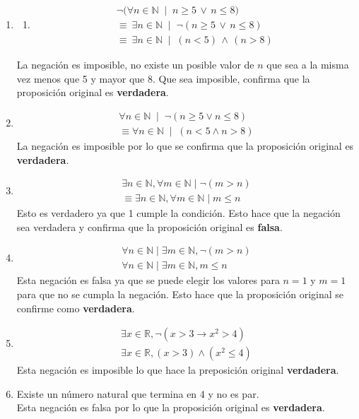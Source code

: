 \documentclass[11pt]{article}
\begin{document}
\begin{enumerate}[label=\roman*)]
\begin{enumerate}
  \item
  \begin{enumerate}
    \item 
    \begin{align*}
      \neg \big(\forall n \in \mathbb{N}\;\mid\; n \ge 5 \,\lor\, n \le 8\big) \\
      \equiv\ \exists n \in \mathbb{N}\;\mid\; \neg(n \ge 5 \,\lor\, n \le 8) \\
      \equiv\ \exists n \in \mathbb{N}\;\mid\; (n < 5) \,\land\, (n > 8)
    \end{align*}
  \end{enumerate}
  La negación es imposible, no existe un posible valor de $n$ que sea a la misma vez menos que 5 y mayor que 8. Que sea imposible, confirma que la proposición original es \textbf{verdadera}.
  \item
    \begin{align*}
        \forall n \in \mathbb{N} \;\mid\; \neg(n \geq 5 \lor n \leq 8) \\
        \equiv \forall n \in \mathbb{N} \;\mid\; (n < 5 \land n > 8)
    \end{align*}
    La negación es imposible por lo que se confirma que la proposición original es \textbf{verdadera}.
  \item \begin{align*}
    \exists n \in \mathbb{N}, \forall m \in \mathbb{N} \mid \neg (m > n) \\ 
    \equiv \exists n \in \mathbb{N}, \forall m \in \mathbb{N} \mid m \leq n
  \end{align*}
  Esto es verdadero ya que 1 cumple la condición. Esto hace que la negación sea verdadera y confirma que la proposición original es \textbf{falsa}.
  \item \begin{align*}
    \forall n \in \mathbb{N} \mid \exists m \in \mathbb{N}, \neg(m > n )\\
    \forall n \in \mathbb{N} \mid \exists m \in \mathbb{N}, m \leq n
  \end{align*}
  Esta negación es falsa ya que se puede elegir los valores para $n = 1$ y $m = 1$ para que no se cumpla la negación. Esto hace que la proposición original se confirme como \textbf{verdadera}. 
  \item \begin{align*}
    \exists x \in \mathbb{R}, \neg (x > 3 \rightarrow x^{2} > 4)\\
    \exists x \in \mathbb{R}, (x > 3) \land (x^{2} \leq 4)
  \end{align*}
  Esta negación es imposible lo que hace la preposición original \textbf{verdadera}.
  \item Existe un número natural que termina en 4 y no es par. \\
  Esta negación es falsa por lo que la proposición original es \textbf{verdadera}. 
\end{enumerate}
\end{enumerate}
\end{document}

